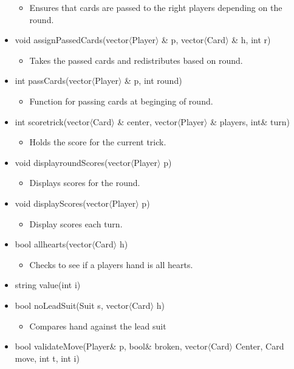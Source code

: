 \documentclass[]{scrartcl}
\begin{document}
\begin{itemize}
			\begin{itemize}
				\item Ensures that cards are passed to the right players depending on the round.
			\end{itemize}
		\item void assignPassedCards(vector$\langle$Player$\rangle$ \& p, vector$\langle$Card$\rangle$ \& h, int r)  
			\begin{itemize}
				\item Takes the passed cards and redistributes based on round.
			\end{itemize}
		\item int passCards(vector$\langle$Player$\rangle$ \& p, int round) 
			\begin{itemize}
				\item Function for passing cards at beginging of round.
			\end{itemize}
		\item int scoretrick(vector$\langle$Card$\rangle$ \& center, vector$\langle$Player$\rangle$ \& players, int\& turn)
			\begin{itemize}
				\item 	Holds the score for the current trick.
			\end{itemize}
		\item void displayroundScores(vector$\langle$Player$\rangle$ p)
			\begin{itemize}
				\item Displays scores for the round.
			\end{itemize}
		\item void displayScores(vector$\langle$Player$\rangle$  p)
			\begin{itemize}
				\item Display scores each turn.
			\end{itemize}
		\item bool allhearts(vector$\langle$Card$\rangle$ h)
			\begin{itemize}
				\item Checks to see if a players hand is all hearts.
			\end{itemize}
		\item string value(int i)
		\item bool noLeadSuit(Suit s, vector$\langle$Card$\rangle$ h)
			\begin{itemize}
				\item Compares hand against the lead suit
			\end{itemize}
		\item bool validateMove(Player\& p, bool\& broken, vector$\langle$Card$\rangle$  Center, Card move, int t, int i)

\end{itemize}
\end{document}

